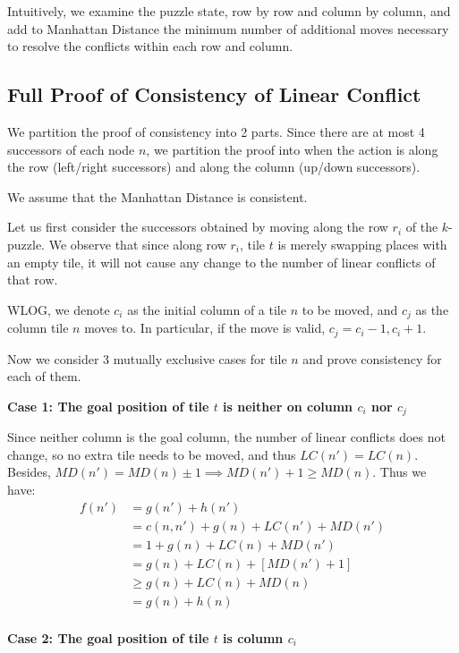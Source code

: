 \documentclass{llncs}
\begin{document}
Intuitively, we examine the puzzle state, row by row and column by column, and add to Manhattan Distance the minimum number of additional moves necessary to resolve the conflicts within each row and column.

\subsection{Full Proof of Consistency of Linear Conflict}
We partition the proof of consistency into 2 parts. Since there are at most 4 successors of each node $n$, we partition the proof into when the action is along the row (left/right successors) and along the column (up/down successors).

We assume that the Manhattan Distance is consistent.

Let us first consider the successors obtained by moving along the row $r_i$ of the $k$-puzzle. We observe that since along row $r_i$, tile $t$ is merely swapping places with an empty tile, it will not cause any change to the number of linear conflicts of that row.

WLOG, we denote $c_i$ as the initial column of a tile $n$ to be moved, and $c_j$ as the column tile $n$ moves to. In particular, if the move is valid, $c_j = c_i - 1, c_i + 1$.

Now we consider 3 mutually exclusive cases for tile $n$ and prove consistency for each of them.

\textbf{Case 1: The goal position of tile $t$ is neither on column $c_i$ nor $c_j$}

Since neither column is the goal column, the number of linear conflicts does not change, so no extra tile needs to be moved, and thus $LC(n') = LC(n)$. Besides, $MD(n') = MD(n) \pm 1 \implies MD(n') + 1 \geq MD(n)$. Thus we have:
\begin{align}
    f(n') \nonumber
    	&= g(n') + h(n') \\\nonumber
        &= c(n,n') + g(n) + LC(n') + MD(n') \\\nonumber
        &= 1 + g(n) + LC(n) + MD(n') \\\nonumber
        &= g(n) + LC(n) + [MD(n') + 1] \\\nonumber
        &\geq g(n) + LC(n) + MD(n) \\\nonumber
        &= g(n) + h(n) \\\nonumber
\end{align}

\textbf{Case 2: The goal position of tile $t$ is column $c_i$}
\end{document}
